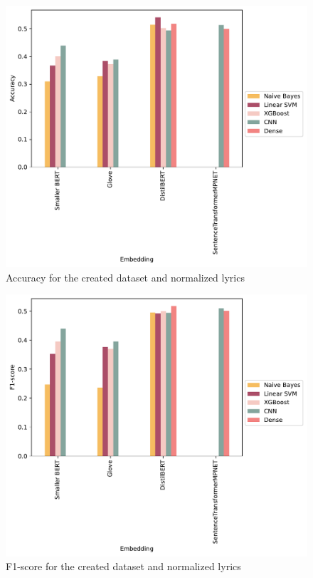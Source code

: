 \begin{figure}
\centering
\includegraphics[width=0.8\linewidth]{plots/accuracy_dataset_norm.pdf}
\caption{Accuracy for the created dataset and normalized lyrics}
\label{fig:acc_dataset_norm}
\end{figure}

\begin{figure}
\centering
\includegraphics[width=0.8\linewidth]{plots/f1_dataset_norm.pdf}
\caption{F1-score for the created dataset and normalized lyrics}
\label{fig:f1_dataset_norm}
\end{figure}
\twocolumn